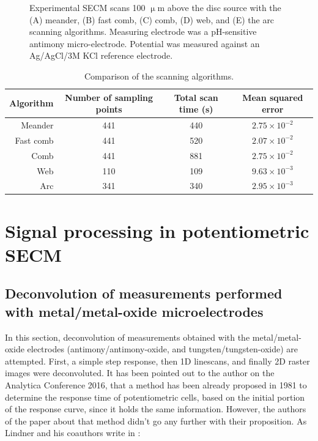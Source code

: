 \begin{figure}[H]
\caption[Experimental SECM scans 100 $\upmu$m above the disc source.]{Experimental SECM scans 100 $\upmu$m above the disc source with the (A) meander, (B) fast comb, (C) comb, (D) web, and (E) the arc scanning algorithms.
Measuring electrode was a pH-sensitive antimony micro-electrode.
Potential was measured against an Ag/AgCl/3M KCl reference electrode.}
\label{fig:measurements}
\end{figure}

\begin{table}
                \caption{Comparison of the scanning algorithms.}
                \label{table:comp}
                \centering
                \begin{tabular}{r c c c}
                        Algorithm & Number of sampling points & Total scan time (s) & Mean squared error \\
                        \hline
                        Meander & 441 & 440 & $2.75\times 10^{-2}$ \\
                        Fast comb & 441 & 520  & $2.07\times 10^{-2}$ \\
                        Comb & 441 & 881 & $2.75\times 10^{-2}$ \\
                        Web & 110 & 109 & $9.63\times 10^{-3}$ \\
			Arc & 341 & 340 & $2.95\times 10^{-3}$ \\
                \end{tabular}
\end{table}

	\newpage
	\section{Signal processing in potentiometric SECM}
	\label{dec_result}

		\subsection{Deconvolution of measurements performed with metal/metal-oxide microelectrodes}
In this section, deconvolution of measurements obtained with the metal/metal-oxide electrodes (antimony/antimony-oxide, and tungsten/tungsten-oxide) are attempted.
First, a simple step response, then 1D linescans, and finally 2D raster images were deconvoluted.
It has been pointed out to the author on the Analytica Conference 2016, that a method has been already proposed in 1981 to determine the response time of potentiometric cells, based on the initial portion of the response curve, since it holds the same information.
However, the authors of the paper about that method didn't go any further with their proposition.
As Lindner and his coauthors write in \cite{lindner1984definition}:

